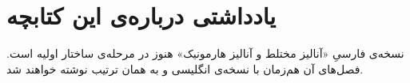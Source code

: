 \chapter*{یادداشتی درباره‌ی این کتابچه}

نسخه‌ی فارسیِ «آنالیز مختلط و آنالیز هارمونیک» هنوز در مرحله‌ی ساختار اولیه است. فصل‌های آن هم‌زمان با نسخه‌ی انگلیسی و به همان ترتیب نوشته خواهند شد.

